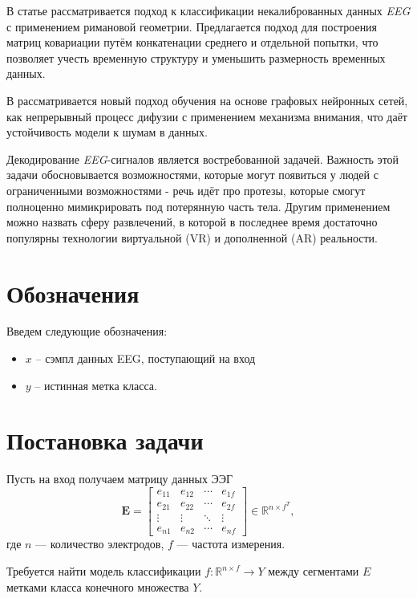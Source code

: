 \documentclass{article}
\begin{document}
\par
В статье \cite{PP2014} рассматривается подход к классификации некалиброванных данных \textit{EEG} с применением римановой геометрии. Предлагается подход для построения матриц ковариации путём конкатенации среднего и отдельной попытки, что позволяет учесть временную структуру и уменьшить размерность временных данных.
\par
В \cite{GRAND2021} рассматривается новый подход обучения на основе графовых нейронных сетей, как непрерывный процесс дифузии с применением механизма внимания, что даёт устойчивость модели к шумам в данных.
\par
Декодирование \textit{EEG}-сигналов является востребованной задачей. Важность этой задачи обосновывается возможностями, которые могут появиться у людей с ограниченными возможностями - речь идёт про протезы, которые смогут полноценно мимикрировать под потерянную часть тела. Другим применением можно назвать сферу развлечений, в которой в последнее время достаточно популярны технологии виртуальной (VR) и дополненной (AR) реальности.

\section{Обозначения}
\label{sec:headings Обозначения}
	Введем следующие обозначения:
	\begin{itemize}
		\item $x$ -- сэмпл данных EEG, поступающий на вход
		\item $y$ -- истинная метка класса.
	\end{itemize}

\section{Постановка задачи}
\label{sec:headings Постановка}
Пусть на вход получаем матрицу данных ЭЭГ 
\begin{equation}
\bm{E} = \begin{bmatrix}
e_{11} & e_{12} & \cdots & e_{1f} \\
e_{21} & e_{22} & \cdots & e_{2f} \\
\vdots & \vdots & \ddots & \vdots \\
e_{n1} & e_{n2} & \cdots & e_{nf}
\end{bmatrix}  \in {\mathbb{R}^{n \times f}^T},
\end{equation}
 где $n$ --- количество электродов, $f$ --- частота измерения.
 \par
 Требуется найти модель классификации $f: \mathbb{R}^{n \times f} \rightarrow Y$ между сегментами ${E}$ метками класса конечного множества $Y$.\\
\end{document}
